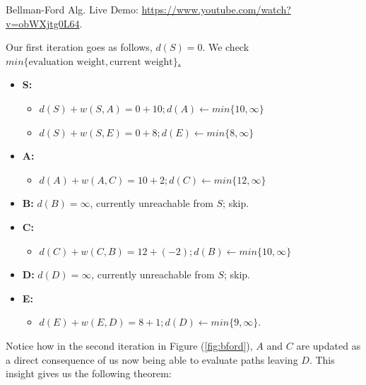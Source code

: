 \vspace{-1em}
\begin{Tip}
    Bellman-Ford Alg. Live Demo: \url{https://www.youtube.com/watch?v=obWXjtg0L64}.
\end{Tip}
\newpage 

\noindent
Our first iteration goes as follows, $d(S)=0$. We check \underline{$min\{\text{evaluation weight},\text{current weight}\}$.}
\begin{itemize}
    \item \textbf{S:}
    \vspace{-2em}
    \begin{itemize}
        \item [] $d(S)+w(S,A)=0+10; d(A)\gets min\{10,\infty\}$
        \item [] $d(S)+w(S,E)=0+8; d(E)\gets min\{8,\infty\}$
    \end{itemize}
    \item \textbf{A:}
    \vspace{-2em}
    \begin{itemize}
        \item [] $d(A)+w(A,C)=10+2; d(C)\gets min\{12,\infty\}$
    \end{itemize}
    \item \textbf{B:} \hspace{.5em} $d(B)=\infty$, currently unreachable from $S$; skip.
    \item \textbf{C:}
    \vspace{-2em}
    \begin{itemize}
        \item [] $d(C)+w(C,B)=12+(-2); d(B)\gets min\{10,\infty\}$
    \end{itemize}
    \item \textbf{D:} \hspace{.5em} $d(D)=\infty$, currently unreachable from $S$; skip.
    \item \textbf{E:}
    \vspace{-2em}
    \begin{itemize}
        \item [] $d(E)+w(E,D)=8+1; d(D)\gets min\{9,\infty\}$.
    \end{itemize}
\end{itemize}
\noindent
Notice how in the second iteration in Figure (\ref{fig:bford}), $A$ and $C$ are updated as a direct consequence of us now being 
able to evaluate paths leaving $D$. This insight gives us the following theorem:

